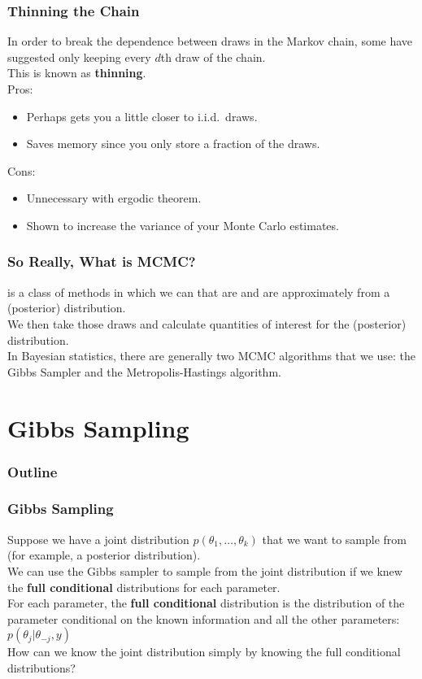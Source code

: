 \documentclass[handout]{beamer}
\begin{document}
\begin{frame}
\frametitle{Thinning the Chain}
\pause
In order to break the dependence between draws in the Markov chain,
some have suggested only keeping every $d$th draw of the chain. \\
\bigskip
\pause
This is known as \textbf{thinning}.\\
\bigskip
\pause
Pros: 
\begin{itemize}
\pause
\item Perhaps gets you a little closer to i.i.d.\ draws.
\pause
\item Saves memory since you only store a fraction of the draws.
\end{itemize}
\bigskip
\pause
Cons:
\begin{itemize}
\pause
\item Unnecessary with ergodic theorem.
\pause
\item Shown to increase the variance of your Monte Carlo estimates.
\end{itemize}
\end{frame}

\begin{frame}
\frametitle{So Really, What is MCMC?}
\pause
{} is a class of methods in which we can  that are  and are
approximately from a (posterior) distribution.  \\
\bigskip
\pause
We then take those draws and calculate quantities of interest for the
(posterior) distribution.\\
\bigskip
\pause
In Bayesian statistics, there are generally two MCMC algorithms that
we use: the Gibbs Sampler and the Metropolis-Hastings algorithm.
\end{frame}

\section{Gibbs Sampling}

\begin{frame}
\frametitle{Outline}
\tableofcontents[currentsection]
\end{frame}

\begin{frame}
\frametitle{Gibbs Sampling}
\pause
Suppose we have a joint distribution $p(\theta_1, \dots,\theta_k)$
that we want to sample from (for example, a posterior distribution). \\  
\bigskip
\pause
We can use the Gibbs sampler to sample from the joint distribution if
we knew the \textbf{full conditional} distributions for each parameter.\\
\bigskip
\pause
For each parameter, the \textbf{full conditional} distribution is the
distribution of the parameter conditional on the known information and
all the other parameters: \pause $p(\theta_j | \theta_{-j}, y)$\\
\bigskip
\pause
How can we know the joint distribution simply by knowing the full
conditional distributions?
\end{frame}
\end{document}
